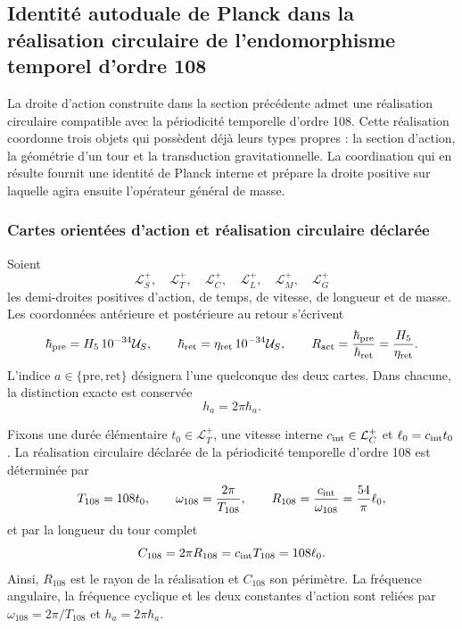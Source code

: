 \subsection[Identité autoduale de Planck sur la périodicité d'ordre 108]{Identité autoduale de
Planck dans la réalisation circulaire de l'endomorphisme temporel d'ordre 108}
\label{sec:identidad-autodual-planck-ct108-rev3}

La droite d’action construite dans la section précédente admet une
réalisation circulaire compatible avec la périodicité temporelle d’ordre 108.
Cette réalisation coordonne trois objets qui possèdent déjà leurs types propres : la
section d’action, la géométrie d’un tour et la transduction
gravitationnelle. La coordination qui en résulte fournit une identité de
Planck interne et prépare la droite positive sur laquelle agira ensuite
l’opérateur général de masse.

\subsubsection{Cartes orientées d’action et réalisation circulaire déclarée}

Soient
\[
 \mathcal L_S^+,\quad \mathcal L_T^+,\quad \mathcal L_C^+,
 \quad \mathcal L_L^+,\quad \mathcal L_M^+,\quad \mathcal L_G^+
\]
les demi-droites positives d’action, de temps, de vitesse, de longueur et de masse.
Les coordonnées antérieure et postérieure au retour s’écrivent
\begin{equation}
 \hbar_{\rm pre}=H_5\,10^{-34}\mathcal U_S,
 \qquad
 \hbar_{\rm ret}=\eta_{\rm ret}\,10^{-34}\mathcal U_S,
 \qquad
 R_{\rm act}=\frac{\hbar_{\rm pre}}{\hbar_{\rm ret}}
 =\frac{H_5}{\eta_{\rm ret}}.
 \label{eq:planck-ct108-cartas-pre-ret-rev3}
\end{equation}
L’indice \(a\in\{\mathrm{pre},\mathrm{ret}\}\) désignera l’une quelconque
des deux cartes. Dans chacune, la distinction exacte est conservée
\begin{equation}
 h_a=2\pi\hbar_a .
 \label{eq:planck-ct108-h-hbar-rev3}
\end{equation}

Fixons une durée élémentaire \(t_0\in\mathcal L_T^+\), une vitesse
interne \(c_{\rm int}\in\mathcal L_C^+\) et
\(\ell_0=c_{\rm int}t_0\). La réalisation circulaire déclarée de la
périodicité temporelle d’ordre 108 est déterminée par
\begin{equation}
 T_{108}=108t_0,
 \qquad
 \omega_{108}=\frac{2\pi}{T_{108}},
 \qquad
 R_{108}=\frac{c_{\rm int}}{\omega_{108}}
 =\frac{54}{\pi}\ell_0,
 \label{eq:planck-ct108-realizacion-circular-rev3}
\end{equation}
et par la longueur du tour complet
\begin{equation}
 C_{108}=2\pi R_{108}=c_{\rm int}T_{108}=108\ell_0.
 \label{eq:planck-ct108-perimetro-rev3}
\end{equation}
Ainsi, \(R_{108}\) est le rayon de la réalisation et \(C_{108}\) son
périmètre. La fréquence angulaire, la fréquence cyclique et les deux
constantes d’action sont reliées par
\(\omega_{108}=2\pi/T_{108}\) et \(h_a=2\pi\hbar_a\).

